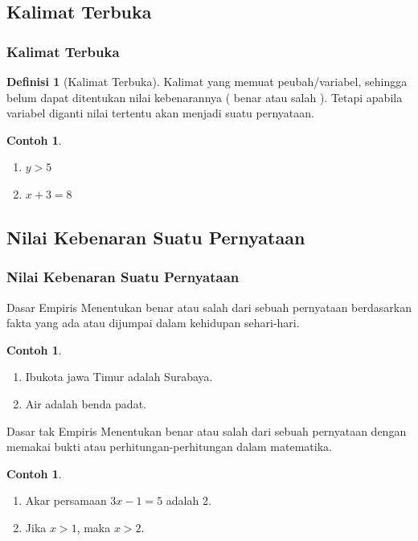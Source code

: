 \documentclass[handout]{beamer}
\theoremstyle{definition}
\newtheorem{definisi}[theorem]{Definisi}
\theoremstyle{example}
\newtheorem{contoh}[theorem]{Contoh}
\begin{document}
\subsection{Kalimat Terbuka}
\begin{frame}
	\frametitle{Kalimat Terbuka}

\begin{definisi}[Kalimat Terbuka]
	 Kalimat yang memuat peubah/variabel, sehingga belum dapat ditentukan nilai kebenarannya ( benar atau salah ). Tetapi apabila variabel diganti nilai tertentu akan menjadi suatu pernyataan.
\end{definisi}

\begin{contoh}
	\begin{enumerate}
		\item $y>5$	
		\item $x + 3 = 8$	
	\end{enumerate}
\end{contoh}

\end{frame}

\subsection{Nilai Kebenaran Suatu Pernyataan}
\begin{frame}[shrink]
\frametitle{Nilai Kebenaran Suatu Pernyataan}
  \begin{block}{Dasar Empiris}
  	Menentukan benar atau salah dari sebuah pernyataan berdasarkan fakta yang ada atau dijumpai dalam kehidupan sehari-hari.
  \end{block}
  
  \begin{contoh}
  	\begin{enumerate}
  		\item Ibukota jawa Timur adalah Surabaya.
  		\item Air adalah benda padat.
  	\end{enumerate}
  \end{contoh}
  
  
  \begin{block}{Dasar tak Empiris}
  	Menentukan benar atau salah dari sebuah pernyataan dengan memakai bukti atau perhitungan-perhitungan dalam matematika.
  \end{block}

  \begin{contoh}
  	\begin{enumerate}
  		\item Akar persamaan $3x-1=5$ adalah 2.
  		\item Jika $x > 1$, maka $x > 2$.
  			
  	\end{enumerate}
  \end{contoh}
\end{frame}
\end{document}
